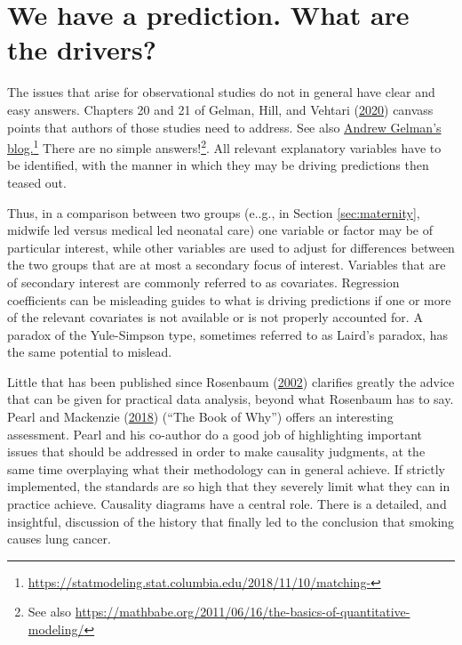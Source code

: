 \documentclass[
  10ptls,
  b5paper]{book}
\begin{document}
\hypertarget{we-have-a-prediction.-what-are-the-drivers}{%
\section{We have a prediction. What are the drivers?}\label{we-have-a-prediction.-what-are-the-drivers}}

The issues that arise for observational studies do not in general have clear and easy answers. Chapters 20 and 21 of Gelman, Hill, and Vehtari (\protect\hyperlink{ref-gelman2020regression}{2020}) canvass points that authors of those studies need to address. See also \href{https://statmodeling.stat.columbia.edu/2018/11/10/matching-discarding-non-matches-deal-lack-complete-overlap-regression-adjust-imbalance-treatment-control-groups/}{Andrew Gelman's blog.}\footnote{\url{https://statmodeling.stat.columbia.edu/2018/11/10/matching-}} There are no simple answers!\footnote{See also \url{https://mathbabe.org/2011/06/16/the-basics-of-quantitative-modeling/}}. All relevant explanatory variables have to be identified, with the manner in which they may be driving predictions then teased out.

Thus, in a comparison between two groups (e..g., in Section \ref{sec:maternity}, midwife led versus medical led neonatal care) one variable or factor may be of particular interest, while other variables are used to adjust for differences between the two groups that are at most a secondary focus of interest. Variables that are of secondary interest are commonly referred to as covariates. Regression coefficients can be misleading guides to what is driving predictions if one or more of the relevant covariates is not available or is not properly accounted for. A paradox of the Yule-Simpson type, sometimes referred to as Laird's paradox, has the same potential to mislead.

Little that has been published since Rosenbaum (\protect\hyperlink{ref-RosBook}{2002}) clarifies greatly the advice that can be given for practical data analysis, beyond what Rosenbaum has to say. Pearl and Mackenzie (\protect\hyperlink{ref-pearl2018book}{2018}) (``The Book of Why'') offers an interesting assessment. Pearl and his co-author do a good job of highlighting important issues that should be addressed in order to make causality judgments, at the same time overplaying what their methodology can in general achieve. If strictly implemented, the standards are so high that they severely limit what they can in practice achieve. Causality diagrams have a central role. There is a detailed, and insightful, discussion of the history that finally led to the conclusion that smoking causes lung cancer.
\end{document}
